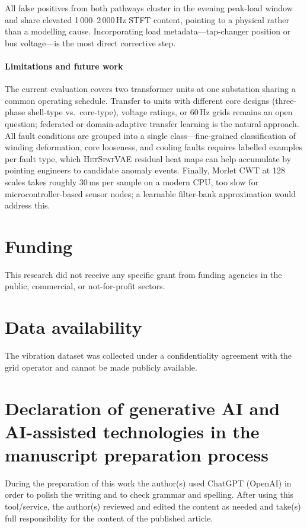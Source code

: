 \documentclass[preprint,12pt,3p]{elsarticle}
\newcommand{\hetspatvae}{\textsc{HetSpatVAE}\xspace} %
\newcommand{\hczv}{\hetspatvae}                    %
\begin{document}
All false positives from both pathways cluster in the evening peak-load
window and share elevated 1\,000--2\,000\,Hz STFT content, pointing to
a physical rather than a modelling cause.
Incorporating load metadata---tap-changer position or bus voltage---is
the most direct corrective step.

\paragraph{Limitations and future work}
The current evaluation covers two transformer units at one substation
sharing a common operating schedule.
Transfer to units with different core designs (three-phase shell-type
vs.\ core-type), voltage ratings, or 60\,Hz grids remains an open
question; federated or domain-adaptive transfer learning is the
natural approach.
All fault conditions are grouped into a single class---fine-grained
classification of winding deformation, core looseness, and cooling
faults requires labelled examples per fault type, which \hczv
residual heat maps can help accumulate by pointing engineers to
candidate anomaly events.
Finally, Morlet CWT at 128 scales takes roughly 30\,ms per sample on
a modern CPU, too slow for microcontroller-based sensor nodes;
a learnable filter-bank approximation would address this.



\section*{Funding}
This research did not receive any specific grant from funding agencies
in the public, commercial, or not-for-profit sectors.

\section*{Data availability}
The vibration dataset was collected under a confidentiality agreement
with the grid operator and cannot be made publicly available.


\section*{Declaration of generative AI and AI-assisted technologies
  in the manuscript preparation process}
During the preparation of this work the author(s) used ChatGPT
(OpenAI) in order to polish the writing and to check grammar and
spelling. After using this tool/service, the author(s) reviewed and
edited the content as needed and take(s) full responsibility for the
content of the published article.
\end{document}
